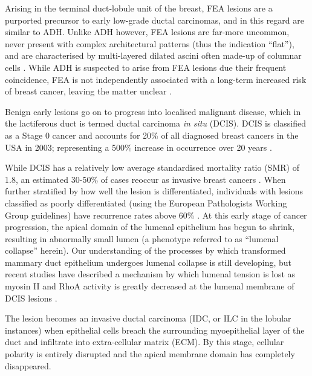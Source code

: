 Arising in the terminal duct-lobule unit of the breast, FEA lesions are a purported precursor to early low-grade ductal carcinomas, and in this regard are similar to ADH. Unlike ADH however, FEA lesions are far-more uncommon, never present with complex architectural patterns (thus the indication ``flat''), and are characterised by multi-layered dilated ascini often made-up of columnar cells \citep{pinder2017}. While ADH is suspected to arise from FEA lesions due their frequent coincidence, FEA is not independently associated with a long-term increased risk of breast cancer, leaving the matter unclear \citep{bombonati2011,lerwill2008,acott2016}.

%
%


Benign early lesions go on to progress into localised malignant disease, which in the lactiferous duct is termed ductal carcinoma {\it in situ} (DCIS). DCIS is classified as a Stage 0 cancer and accounts for 20\% of all diagnosed breast cancers in the USA in 2003; representing a 500\% increase in occurrence over 20 years \citep{bleicher2013, kerlikowske2010}.\par

While DCIS has a relatively low average standardised mortality ratio (SMR) of 1.8, an estimated 30-50\% of cases reoccur as invasive breast cancers \citep{narod2015,page1982,betsill1978}. When further stratified by how well the lesion is differentiated, individuals with lesions classified as poorly differentiated (using the European Pathologists Working Group guidelines) have recurrence rates above 60\% \citep{badve1998}. At this early stage of cancer progression, the apical domain of the lumenal epithelium has begun to shrink, resulting in abnormally small lumen (a phenotype referred to as ``lumenal collapse'' herein). Our understanding of the processes by which transformed mammary duct epithelium undergoes lumenal collapse is still developing, but recent studies have described a mechanism by which lumenal tension is lost as myosin II and RhoA activity is greatly decreased at the lumenal membrane of DCIS lesions \citep{halaoui2017}. \par

The lesion becomes an invasive ductal carcinoma (IDC, or ILC in the lobular instances) when epithelial cells breach the surrounding myoepithelial layer of the duct and infiltrate into extra-cellular matrix (ECM). By this stage, cellular polarity is entirely disrupted and the apical membrane domain has completely disappeared.\par

